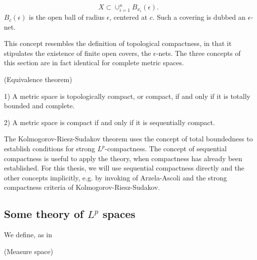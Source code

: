 \begin{definition}
\begin{definition}
\begin{definition}
	\begin{equation}
		X \subset \cup_{i = 1}^n B_{x_i}(\epsilon).
	\end{equation} 
	$B_{c}(\epsilon)$ is the open ball of radius $\epsilon$, centered at $c$. Such a covering is dubbed an $\epsilon$-net.
\end{definition}

This concept resembles the definition of topological compactness, in that it stipulates the existence of finite open covers, the $\epsilon$-nets. The three concepts of this section are in fact identical for complete metric spaces.

\begin{theorem} (Equivalence theorem)
	
	1) A metric space is topologically compact, or compact, if and only if it is totally bounded and complete. 
	
	
	2) A metric space is compact if and only if it is sequentially compact. 
	
\end{theorem}

The Kolmogorov-Riesz-Sudakov theorem uses the concept of total boundedness to establish conditions for strong $L^p$-compactness. The concept of sequential compactness is useful to apply the theory, when compactness has already been established. For this thesis, we will use sequential compactness directly and the other concepts implicitly, e.g. by invoking of Arzela-Ascoli and the strong compactness criteria of Kolmogorov-Riesz-Sudakov. 





\subsection{Some theory of $L^p$ spaces}

We define, as in ~\autocite{brezis2010functional}
\begin{definition} (Measure space)
	

\end{definition}
\end{definition}
\end{definition}
